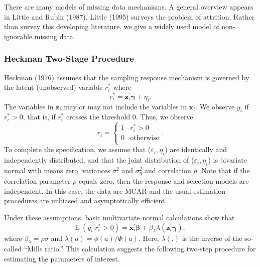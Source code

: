 There are many models of missing data mechanisms. A general overview
appears in Little and Rubin (1987). Little (1995) surveys the
problem of attrition. Rather than survey this developing literature,
we give a widely used model of non-ignorable missing data.

\subsubsection*{Heckman Two-Stage Procedure}

Heckman (1976) assumes that the sampling response mechanism is
governed by the latent (unobserved) variable $r_i^{\ast}$ where
\begin{equation*}
r_i^{\ast} = \mathbf{z}_i^{\prime} \boldsymbol \gamma + \eta _i.
\end{equation*}
The variables in $\mathbf{z}_i$ may or may not include the variables
in $\mathbf{x}_i$. We observe $y_i$ if $r_i^{\ast}>0$, that is, if
$r_i^{\ast}$ crosses the threshold 0. Thus, we observe
\begin{equation*}
r_i = \left\{
              \begin{array}{ll}
                1 & r_i^{\ast}>0 \\
                0 & \mathrm{otherwise} \\
              \end{array}
            \right. .
\end{equation*}
To complete the specification, we assume that
{($\varepsilon_i,\eta_i$)} are identically and independently
distributed, and that the joint distribution of
($\varepsilon_i,\eta_i$)  is bivariate normal with means zero,
variances $\sigma^2$ and $\sigma_{\eta}^2$ and correlation $\rho$.
Note that if the correlation parameter $\rho$ equals zero, then the
response and selection models are independent. In this case, the
data are MCAR and the usual estimation procedures are unbiased and
asymptotically efficient.

Under these assumptions, basic multivariate normal calculations show
that
\begin{equation*}
\mathrm{E~}(y_i | r_i^{\ast}>0) = \mathbf{x}_i^{\prime} \boldsymbol
\beta + \beta_{\lambda} \lambda(\mathbf{z}_i^{\prime} \boldsymbol
\gamma),
\end{equation*}
where $\beta_{\lambda} = \rho \sigma$ and
$\lambda(a)=\phi(a)/\Phi(a)$. Here, $\lambda(.)$ is the inverse of
the so-called ``Mills ratio.'' This calculation suggests the
following two-step procedure for estimating the parameters of
interest.


